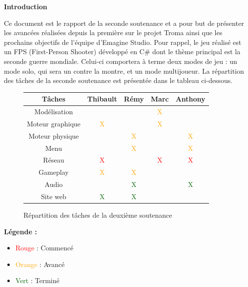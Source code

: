 \documentclass[11pt]{report}
\begin{document}
\tableofcontents

\newpage
\textbf{{\huge Introduction}} \vspace{7mm}

Ce document est le rapport de la seconde soutenance et a pour but de présenter les avancées réalisées depuis la première sur le projet Troma ainsi que les prochains objectifs de l’équipe d’Emagine Studio. Pour rappel, le jeu réalisé est un FPS (First-Person Shooter) développé en C\# dont le thème principal est la seconde guerre mondiale. Celui-ci comportera à terme deux modes de jeu : un mode solo, qui sera un contre la montre, et un mode multijoueur. La répartition des tâches de la seconde soutenance est présentée dans le tableau ci-dessous.

\begin{figure}[htbp]
\centering
\begin{tabular}{ | c || c | c | c | c | }
\hline Tâches & Thibault & Rémy & Marc & Anthony \\
\hline Modélisation & & & \textcolor{orange}{X} & \\
\hline Moteur graphique & \textcolor{orange}{X} & & \textcolor{orange}{X} & \\
\hline Moteur physique & & \textcolor{orange}{X} & & \textcolor{orange}{X} \\
\hline Menu & & \textcolor{orange}{X} & & \textcolor{orange}{X} \\
\hline Réseau & \textcolor{red}{X} & & \textcolor{red}{X} & \textcolor{red}{X} \\
\hline Gameplay & \textcolor{orange}{X} & \textcolor{orange}{X} & & \\
\hline Audio & & \textcolor{darkgreen}{X} & & \textcolor{darkgreen}{X} \\
\hline Site web & \textcolor{darkgreen}{X} & \textcolor{darkgreen}{X} & & \\
\hline
\end{tabular}
\caption{Répartition des tâches de la deuxième soutenance}
\end{figure}

\textbf{Légende :}
\begin{itemize}
  \item \textcolor{red}{Rouge} : Commencé
  \item \textcolor{orange}{Orange} : Avancé
  \item \textcolor{darkgreen}{Vert} : Terminé
\end{itemize}
\vspace*{7mm}
\end{document}
